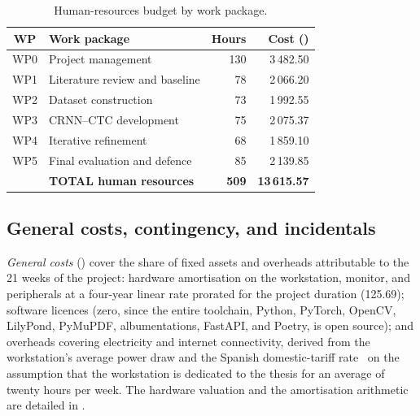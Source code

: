 \begin{table}[ht]
    \centering
    \caption{Human-resources budget by work package.}
    \label{tab:hr-budget}
    \small
    \setlength{\tabcolsep}{5pt}
    \renewcommand{\arraystretch}{1.35}
    \begin{tabularx}{\linewidth}{@{} c L r r @{}}
        \toprule
        \textbf{WP} & \textbf{Work package} & \textbf{Hours} & \textbf{Cost (\EUR{})} \\
        \midrule
        WP0 & Project management              & 130 & 3\,482.50 \\ \tfgrowsep
        WP1 & Literature review and baseline  & 78  & 2\,066.20 \\ \tfgrowsep
        WP2 & Dataset construction            & 73  & 1\,992.55 \\ \tfgrowsep
        WP3 & CRNN--CTC development           & 75  & 2\,075.37 \\ \tfgrowsep
        WP4 & Iterative refinement            & 68  & 1\,859.10 \\ \tfgrowsep
        WP5 & Final evaluation and defence    & 85  & 2\,139.85 \\
        \midrule
        & \textbf{TOTAL human resources}      & \textbf{509} & \textbf{13\,615.57} \\
        \bottomrule
    \end{tabularx}
\end{table}

\subsection{General costs, contingency, and incidentals}

\textit{General costs} () cover the
share of fixed assets and overheads attributable to the 21 weeks
of the project: hardware amortisation on the workstation, monitor,
and peripherals at a four-year linear rate prorated for the
project duration (\EUR{}125.69); software licences (zero, since the
entire toolchain, Python, PyTorch, OpenCV, LilyPond, PyMuPDF,
albumentations, FastAPI, and Poetry, is open source); and overheads
covering electricity and internet connectivity, derived from the
workstation's average power draw and the Spanish domestic-tariff
rate~\cite{reeInformeSistemaElectrico2024} on the assumption that
the workstation is dedicated to the thesis for an average of
twenty hours per week.
The hardware valuation and the amortisation arithmetic are detailed
in .

